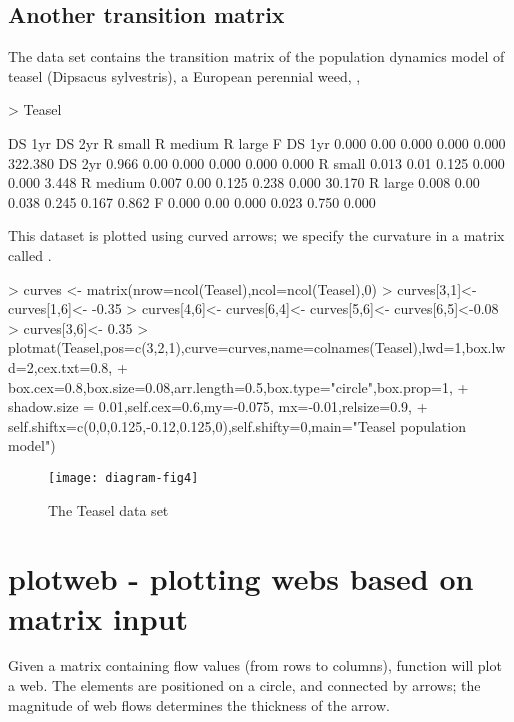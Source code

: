 \documentclass[article,nojss]{jss}
\begin{document}
\subsection{Another transition matrix}
The data set  contains the transition matrix of the population dynamics model of teasel
(Dipsacus sylvestris), a European perennial weed, \citep{Caswell01}, \citep{Soetaert08}
\begin{Schunk}
\begin{Sinput}
> Teasel
\end{Sinput}
\begin{Soutput}
         DS 1yr DS 2yr R small R medium R large       F
DS 1yr    0.000   0.00   0.000    0.000   0.000 322.380
DS 2yr    0.966   0.00   0.000    0.000   0.000   0.000
R small   0.013   0.01   0.125    0.000   0.000   3.448
R medium  0.007   0.00   0.125    0.238   0.000  30.170
R large   0.008   0.00   0.038    0.245   0.167   0.862
F         0.000   0.00   0.000    0.023   0.750   0.000
\end{Soutput}
\end{Schunk}
This dataset is plotted using curved arrows; we specify the curvature in a matrix
called .
\begin{Schunk}
\begin{Sinput}
> curves <- matrix(nrow=ncol(Teasel),ncol=ncol(Teasel),0)
> curves[3,1]<- curves[1,6]<- -0.35
> curves[4,6]<- curves[6,4]<- curves[5,6]<- curves[6,5]<-0.08
> curves[3,6]<-  0.35
> plotmat(Teasel,pos=c(3,2,1),curve=curves,name=colnames(Teasel),lwd=1,box.lwd=2,cex.txt=0.8,
+         box.cex=0.8,box.size=0.08,arr.length=0.5,box.type="circle",box.prop=1,
+         shadow.size = 0.01,self.cex=0.6,my=-0.075, mx=-0.01,relsize=0.9,
+         self.shiftx=c(0,0,0.125,-0.12,0.125,0),self.shifty=0,main="Teasel population model")
\end{Sinput}
\end{Schunk}
\begin{figure}
\begin{center}
\texttt{[image: diagram-fig4]}
\end{center}
\caption{The Teasel data set}
\label{fig:four}
\end{figure}

\section{plotweb - plotting webs based on matrix input}
Given a matrix containing flow values (from rows to columns), function 
will plot a web. The elements are positioned on a circle, and connected by arrows;
the magnitude of web flows determines the thickness of the arrow.
\end{document}
